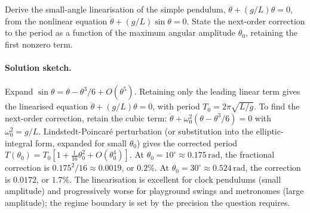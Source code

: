\begin{exercise}
Derive the small-angle linearisation of the simple pendulum,
$\ddot\theta + (g/L) \theta = 0$, from the nonlinear equation
$\ddot\theta + (g/L) \sin\theta = 0$. State the next-order
correction to the period as a function of the maximum angular
amplitude $\theta_{0}$, retaining the first nonzero term.

\paragraph{Solution sketch.} Expand $\sin\theta = \theta -
\theta^{3}/6 + O(\theta^{5})$. Retaining only the leading linear
term gives the linearised equation $\ddot\theta + (g/L)\theta = 0$,
with period $T_{0} = 2\pi\sqrt{L/g}$. To find the next-order
correction, retain the cubic term:
$\ddot\theta + \omega_{0}^{2}(\theta - \theta^{3}/6) = 0$ with
$\omega_{0}^{2} = g/L$. Lindstedt-Poincar{\'e} perturbation
(or substitution into the elliptic-integral form, expanded for
small $\theta_{0}$) gives the corrected period
$T(\theta_{0}) = T_{0}\left[1 + \frac{1}{16}\theta_{0}^{2}
+ O(\theta_{0}^{4})\right]$. At $\theta_{0} = 10^{\circ}
\approx 0.175\,\text{rad}$, the fractional correction is
$0.175^{2}/16 \approx 0.0019$, or $0.2\%$. At
$\theta_{0} = 30^{\circ} \approx 0.524\,\text{rad}$, the
correction is $0.0172$, or $1.7\%$. The linearisation is excellent
for clock pendulums (small amplitude) and progressively worse for
playground swings and metronomes (large amplitude); the regime
boundary is set by the precision the question requires.
\end{exercise}

